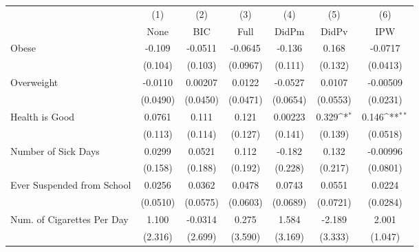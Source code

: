 {
\def\sym#1{\ifmmode^{#1}\else\(^{#1}\)\fi}
\begin{tabular}{l*{6}{c}}
\toprule
            &\multicolumn{1}{c}{(1)}&\multicolumn{1}{c}{(2)}&\multicolumn{1}{c}{(3)}&\multicolumn{1}{c}{(4)}&\multicolumn{1}{c}{(5)}&\multicolumn{1}{c}{(6)}\\
            &\multicolumn{1}{c}{None}&\multicolumn{1}{c}{BIC}&\multicolumn{1}{c}{Full}&\multicolumn{1}{c}{DidPm}&\multicolumn{1}{c}{DidPv}&\multicolumn{1}{c}{IPW}\\
\midrule
Obese       &      -0.109         &     -0.0511         &     -0.0645         &      -0.136         &       0.168         &     -0.0717         \\
            &     (0.104)         &     (0.103)         &    (0.0967)         &     (0.111)         &     (0.132)         &    (0.0413)         \\
\addlinespace
Overweight  &     -0.0110         &     0.00207         &      0.0122         &     -0.0527         &      0.0107         &    -0.00509         \\
            &    (0.0490)         &    (0.0450)         &    (0.0471)         &    (0.0654)         &    (0.0553)         &    (0.0231)         \\
\addlinespace
Health is Good&      0.0761         &       0.111         &       0.121         &     0.00223         &       0.329\sym{*}  &       0.146\sym{**} \\
            &     (0.113)         &     (0.114)         &     (0.127)         &     (0.141)         &     (0.139)         &    (0.0518)         \\
\addlinespace
Number of Sick Days&      0.0299         &      0.0521         &       0.112         &      -0.182         &       0.132         &    -0.00996         \\
            &     (0.158)         &     (0.188)         &     (0.192)         &     (0.228)         &     (0.217)         &    (0.0801)         \\
\addlinespace
Ever Suspended from School&      0.0256         &      0.0362         &      0.0478         &      0.0743         &      0.0551         &      0.0224         \\
            &    (0.0510)         &    (0.0575)         &    (0.0603)         &    (0.0689)         &    (0.0721)         &    (0.0284)         \\
\addlinespace
Num. of Cigarettes Per Day&       1.100         &     -0.0314         &       0.275         &       1.584         &      -2.189         &       2.001         \\
            &     (2.316)         &     (2.699)         &     (3.590)         &     (3.169)         &     (3.333)         &     (1.047)         \\
\bottomrule
\end{tabular}
}
